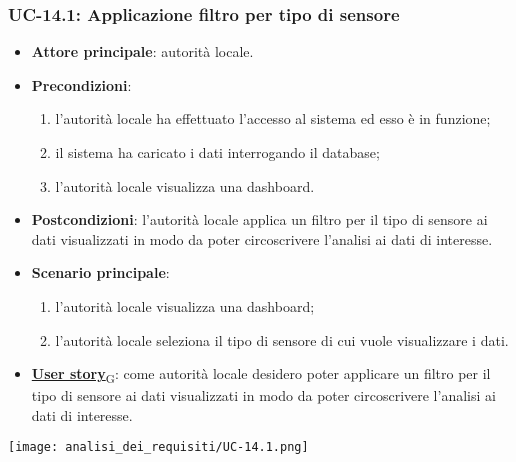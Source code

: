 \subsubsection{UC-14.1: Applicazione filtro per tipo di sensore}
\begin{itemize}
	\item \textbf{Attore principale}: autorità locale.
	\item \textbf{Precondizioni}:
	      \begin{enumerate}
		      \item l'autorità locale ha effettuato l'accesso al sistema ed esso è in funzione;
		      \item il sistema ha caricato i dati interrogando il database;
		      \item l'autorità locale visualizza una dashboard.
	      \end{enumerate}
	\item \textbf{Postcondizioni}: l'autorità locale applica un filtro per il tipo di sensore ai dati visualizzati in modo da poter circoscrivere l'analisi ai dati di interesse.
	\item \textbf{Scenario principale}:
	      \begin{enumerate}
		      \item l'autorità locale visualizza una dashboard;
		      \item l'autorità locale seleziona il tipo di sensore di cui vuole visualizzare i dati.
	      \end{enumerate}
	\item \href{https://7last.github.io/docs/rtb/documentazione-interna/glossario\#user-story}{\textbf{User story}\textsubscript{G}}:
	      come autorità locale desidero poter applicare un filtro per il tipo di sensore ai dati visualizzati in modo da poter circoscrivere l'analisi ai dati di interesse.
\end{itemize}
\begin{center}
	\texttt{[image: analisi\_dei\_requisiti/UC-14.1.png]}
\end{center}

